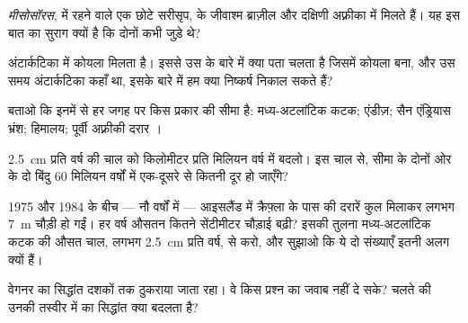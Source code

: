 \begin{exercise}[$\star$]\label{exo:g7:plate-tectonics:4}
\emph{मीसोसॉरस},  में रहने वाले एक छोटे सरीसृप, के जीवाश्म ब्राज़ील
और दक्षिणी अफ़्रीका में मिलते हैं। यह इस बात का सुराग क्यों है कि दोनों
 कभी जुड़े थे?
\end{exercise}

\begin{exercise}[$\star\star$]\label{exo:g7:plate-tectonics:5}
अंटार्कटिका में कोयला मिलता है। इससे उस  के बारे में क्या पता चलता है
जिसमें कोयला बना, और उस समय अंटार्कटिका कहाँ था, इसके बारे में हम क्या
निष्कर्ष निकाल सकते हैं?
\end{exercise}

\begin{exercise}[$\star\star$]\label{exo:g7:plate-tectonics:6}
बताओ कि इनमें से हर जगह पर किस प्रकार की सीमा है: मध्य-अटलांटिक कटक; एंडीज़;
सैन एंड्रियास भ्रंश; हिमालय; पूर्वी अफ़्रीकी दरार
।
\end{exercise}

\begin{exercise}[$\star\star$]\label{exo:g7:plate-tectonics:7}
\qty{2.5}{cm} प्रति वर्ष की चाल को किलोमीटर प्रति मिलियन वर्ष में बदलो। इस
चाल से, सीमा के दोनों ओर के दो बिंदु 60 मिलियन वर्षों में एक-दूसरे से कितनी
दूर हो जाएँगे?
\end{exercise}

\begin{exercise}[$\star\star$]\label{exo:g7:plate-tectonics:8}
1975 और 1984 के बीच --- नौ वर्षों में --- आइसलैंड में क्रैफ़्ला  के
पास की दरारें कुल मिलाकर लगभग \qty{7}{m} चौड़ी हो गईं। हर वर्ष औसतन कितने
सेंटीमीटर चौड़ाई बढ़ी? इसकी तुलना मध्य-अटलांटिक कटक की औसत चाल, लगभग
\qty{2.5}{cm} प्रति वर्ष, से करो, और सुझाओ कि ये दो संख्याएँ इतनी अलग क्यों
हैं।
\end{exercise}

\begin{exercise}[$\star\star$]\label{exo:g7:plate-tectonics:9}
वेगनर का सिद्धांत दशकों तक ठुकराया जाता रहा। वे किस प्रश्न का जवाब नहीं दे
सके? चलते  की उनकी तस्वीर में  का सिद्धांत क्या
बदलता है?
\end{exercise}


